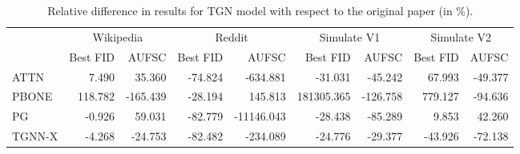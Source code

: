 \begin{table}
\centering
\begin{tabular}{lrrrrrrrr}
\toprule
 & \multicolumn{2}{c}{Wikipedia} & \multicolumn{2}{c}{Reddit} & \multicolumn{2}{c}{Simulate V1} & \multicolumn{2}{c}{Simulate V2} \\
 & Best FID & AUFSC & Best FID & AUFSC & Best FID & AUFSC & Best FID & AUFSC \\
\midrule
ATTN & 7.490 & 35.360 & -74.824 & -634.881 & -31.031 & -45.242 & 67.993 & -49.377 \\
PBONE & 118.782 & -165.439 & -28.194 & 145.813 & 181305.365 & -126.758 & 779.127 & -94.636 \\
PG & -0.926 & 59.031 & -82.779 & -11146.043 & -28.438 & -85.289 & 9.853 & 42.260 \\
TGNN-X & -4.268 & -24.753 & -82.482 & -234.089 & -24.776 & -29.377 & -43.926 & -72.138 \\
\bottomrule
\end{tabular}
\caption{\label{tab:tgn_results_diff}Relative difference in results for TGN model with respect to the original paper (in \%).}
\end{table}
